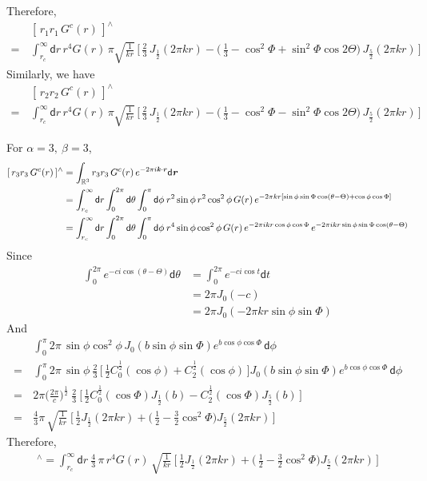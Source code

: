 \documentclass[aps,pre,preprint,unsortedaddress]{revtex4}
\renewcommand{\v}[1]{\textbf{\textit{#1}}}
\renewcommand{\d}[1]{\textsf{#1}}
\begin{document}
Therefore,
\begin{align}\nonumber
  &[\,r_1r_1\,G^c(r)\,]^{\wedge} \\
  =\,&
  \int_{r_c}^\infty \d dr\, r^4 G(r)\,
  \pi \sqrt{ \frac1{kr} }\,
  \Big[\,
  \frac23\,J_{\frac12}(2\pi kr) -
  \big(\,
  \frac13 -
  \cos^2\Phi +
  \sin^2\Phi\cos2\Theta
  \big)\, J_{\frac52}(2\pi kr)
  \,\Big] 
\end{align}
Similarly, we have
\begin{align}\nonumber
  &[\,r_2 r_2\,G^c(r)\,]^{\wedge} \\
  =\,&
  \int_{r_c}^\infty \d dr\, r^4 G(r)\,
  \pi \sqrt{ \frac1{kr} }\,
  \Big[\,
  \frac23\,J_{\frac12}(2\pi kr) -
  \big(\,
  \frac13 -
  \cos^2\Phi -
  \sin^2\Phi\cos2\Theta
  \big)\, J_{\frac52}(2\pi kr)
  \,\Big] 
\end{align}

For $\alpha = 3,\ \beta = 3$,
\begin{align}\nonumber
  [\,r_3 r_3\,G^c(r)\,]^{\wedge} 
  &= \int_{\mathbb R^3} r_3 r_3\,G^c(r)\, e^{-2\pi i\v k\cdot\v r}\d d\v r \\\nonumber
  &= \int_{r_c}^\infty \d dr \int_{0}^{2\pi} \d d\theta \int_0^\pi\d d\phi\:
  r^2\sin\phi \,r^2 \cos^2\phi\,G(r)\,
  e^{-2\pi k r[\sin\phi\sin\Phi\cos(\theta - \Theta) + \cos\phi\cos\Phi]} \\
  &= \int_{r_c}^\infty \d dr \int_{0}^{2\pi} \d d\theta \int_0^\pi\d d\phi\:
  r^4\sin\phi\cos^2\phi\,G(r)\,e^{-2\pi i kr\cos\phi\cos\Phi}
  \,e^{-2\pi i kr\sin\phi\sin\Phi\cos(\theta- \Theta)}
\end{align}
Since
\begin{align}\nonumber
  \int_0^{2\pi} e^{-c i\cos(\theta - \Theta)} \d d\theta
  &=
  \int_0^{2\pi} e^{-c i\cos t} \d dt \\\nonumber
  &=
  2\pi J_0(-c)\\
  & =
  2\pi J_0(-2\pi kr\sin\phi\sin\Phi)
\end{align}
And
\begin{align}\nonumber
  &
  \int_0^\pi 2\pi \,\sin\phi\cos^2\phi\,
  J_0(b\sin\phi\sin\Phi) e^{b\cos\phi\cos\Phi} \,\d d\phi \\\nonumber
  = \,&
  \int_0^\pi 2\pi \,\sin\phi \:\frac23\,
  \Big[\,
  \frac12 C_0^{\frac12} (\cos\phi) + C_2^{\frac12}(\cos\phi)
  \,\Big]
  J_0(b\sin\phi\sin\Phi) e^{b\cos\phi\cos\Phi} \,\d d\phi \\ \nonumber
  = \,&
  2\pi \Big(\frac{2\pi}c \Big)^{\frac12} \:\frac23\:
  \Big[\,
  \frac12 C_0^{\frac12}(\cos\Phi) J_{\frac12}(b) -
  C_2^{\frac12} (\cos\Phi) J_{\frac52}(b)
  \,\Big] \\
  = \,&
  \frac43 \pi \,\sqrt{\frac1{kr}}\:
  \Big[\,
  \frac12 J_{\frac12}(2\pi kr) +
  \big(\,
  \frac12 - \frac32 \cos^2\Phi
  \big)
  J_{\frac52}(2\pi kr)
  \,\Big]
\end{align}
Therefore,
\begin{align}
  [\,r_3 r_3\,G^c(r)\,]^{\wedge} 
  =
  \int_{r_c}^\infty \d dr\: \frac43\,\pi\,r^4 G(r)\,
  \sqrt{ \frac1{kr} }\,
  \Big[\,
  \frac12 J_{\frac12}(2\pi kr) +
  \big(\,
  \frac12 - \frac32 \cos^2\Phi
  \big)
  J_{\frac52}(2\pi kr)
  \,\Big]
\end{align}
\end{document}
